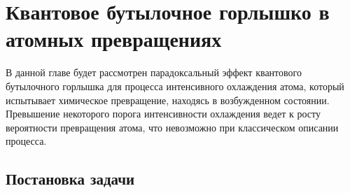 \chapter{Квантовое бутылочное горлышко в атомных превращениях}\label{ch:ch2}

В данной главе будет рассмотрен парадоксальный эффект квантового бутылочного горлышка для процесса интенсивного охлаждения атома, который испытывает химическое превращение, находясь в возбужденном состоянии. Превышение некоторого порога интенсивности охлаждения ведет к росту вероятности превращения атома, что невозможно при классическом описании процесса.

\section{Постановка задачи}\label{sec:ch2/sec1}
